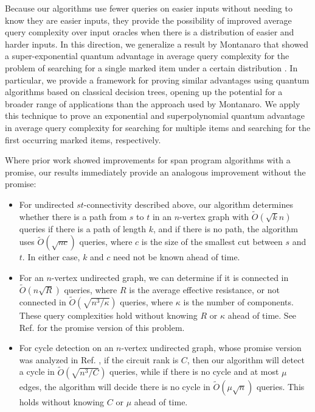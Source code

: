 \documentclass[cleveref, autoref, thm-restate,11pt]{article}
\theoremstyle{definition}
\begin{document}
Because our algorithms use fewer queries on easier inputs without needing to
know they are easier inputs, they provide the possibility of improved
average query complexity over input oracles when there is a distribution of easier and
harder inputs. In this direction, we generalize a result by Montanaro that
showed a super-exponential quantum advantage in average query complexity for
the problem of searching for a single marked item under a certain
distribution \cite{montanaro2010quantum}. In particular, we provide a
framework for proving similar advantages using quantum algorithms based on
classical decision trees, opening up the potential for a broader range of
applications than the approach used by Montanaro. We apply this technique to
prove an exponential and superpolynomial quantum advantage in average query
complexity for searching for multiple items and searching for the first
occurring marked items, respectively.

Where prior work showed improvements for span program algorithms with a
promise, our results immediately provide an analogous improvement without the
promise:
\begin{itemize}
\item For undirected $st$-connectivity described above, our algorithm determines whether there is a path from $s$ to
$t$ in an $n$-vertex graph with $\tilde{O}(\sqrt{k}n)$ queries if there is a path of length $k$,
 and if there is no path,
the algorithm uses $\tilde{O}(\sqrt{nc})$ queries, where $c$ is the size of
the smallest cut between $s$ and $t$. In either case, $k$ and $c$ need not be known ahead of time.
\item For an $n$-vertex undirected graph, we can determine if it is connected in $\tilde{O}(n\sqrt{R})$ queries, where $R$ is the average
effective resistance, or not connected in $\tilde{O}(\sqrt{n^{3}/\kappa})$ queries, where $\kappa$ is the number of components. These query complexities hold without knowing $R$ or $\kappa$ ahead of time. See Ref.
\cite{jarretQuantumAlgorithmsConnectivity2018} for the promise version of this problem.
\item For cycle detection on an $n$-vertex undirected graph,
whose promise version was analyzed in Ref.
\cite{delorenzoApplicationsQuantumAlgorithm2019a}, if the circuit rank is $C$, then our algorithm will detect a cycle in $\tilde{O}(\sqrt{n^{3}/C})$ queries, while if there is
no cycle and at most $\mu$ edges, the algorithm will decide there is no cycle
in $\tilde{O}(\mu\sqrt{n})$ queries. This holds
without knowing $C$ or $\mu$ ahead of time.
\end{itemize}
\end{document}
